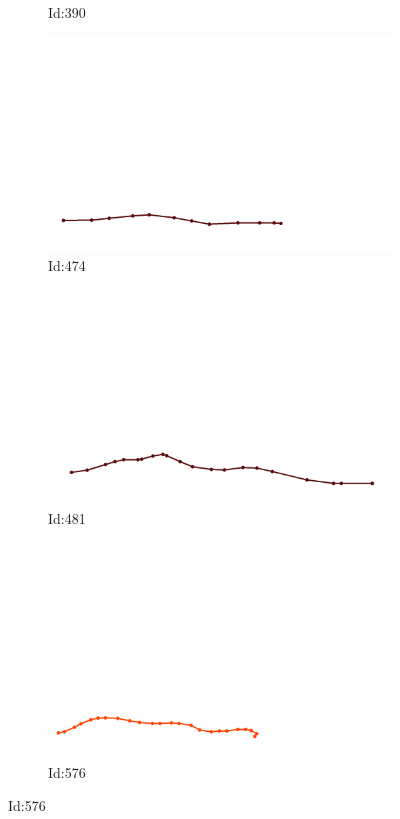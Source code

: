 \documentclass[12pt,twoside]{report}
\begin{document}
\begin{figure}
\begin{subfigure}[b]{0.20\textwidth}
\caption{Id:390}
\end{subfigure}
\begin{subfigure}[b]{0.20\textwidth}
\centering
\includegraphics[width=\textwidth]{../../trajectories/474.png}
\caption{Id:474}
\end{subfigure}
\begin{subfigure}[b]{0.20\textwidth}
\centering
\includegraphics[width=\textwidth]{../../trajectories/481.png}
\caption{Id:481}
\end{subfigure}
\begin{subfigure}[b]{0.20\textwidth}
\centering
\includegraphics[width=\textwidth]{../../trajectories/576.png}
\caption{Id:576}
\end{subfigure}
\end{figure}
\end{document}

